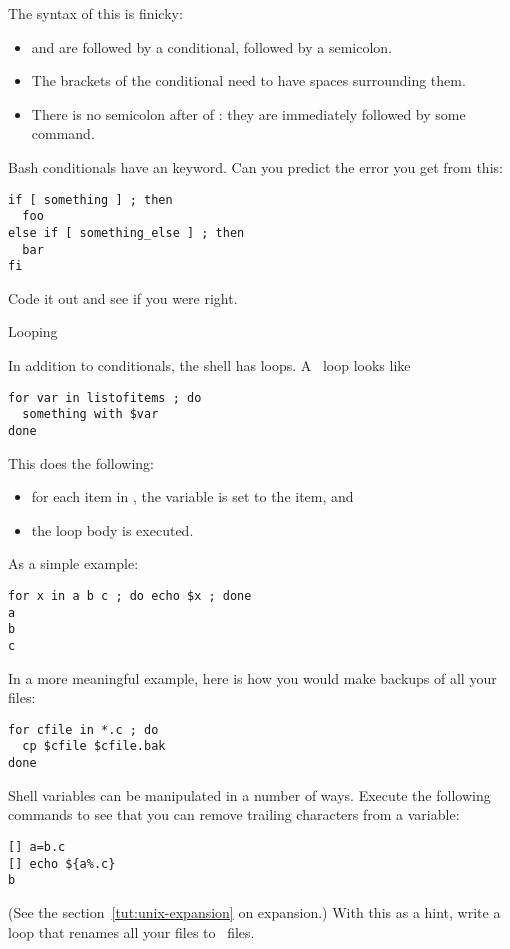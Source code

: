 The syntax of this is finicky:
\begin{itemize}
\item {} and  are followed by a
  conditional, followed by a semicolon.
\item The brackets of the conditional need to have spaces surrounding
  them.
\item There is no semicolon after  of :
  they are immediately followed by some command.
\end{itemize}

\begin{exercise}
  Bash conditionals have an  keyword.
  Can you predict the error you get from this:
\begin{verbatim}
if [ something ] ; then
  foo
else if [ something_else ] ; then
  bar
fi
\end{verbatim}
Code it out and see if you were right.
\end{exercise}

 {Looping}

In addition to conditionals,
the shell has loops. A~ loop looks like
\begin{verbatim}
for var in listofitems ; do
  something with $var
done
\end{verbatim}
This does the following:
\begin{itemize}
\item for each item in , the variable  is set to the
  item, and
\item the loop body is executed.
\end{itemize}
As a simple example:
\begin{verbatim}
for x in a b c ; do echo $x ; done
a
b
c
\end{verbatim}
In a more meaningful example,
here is how you would make backups of all your~
files:
\begin{verbatim}
for cfile in *.c ; do
  cp $cfile $cfile.bak
done
\end{verbatim}
Shell variables can be manipulated in a number of ways.
Execute the following commands to see that you can remove trailing
characters from a variable:
\begin{verbatim}
[] a=b.c
[] echo ${a%.c}
b
\end{verbatim}
(See the section~\ref{tut:unix-expansion} on expansion.)
With this as a hint, write a loop that renames all your  files
to~ files.

